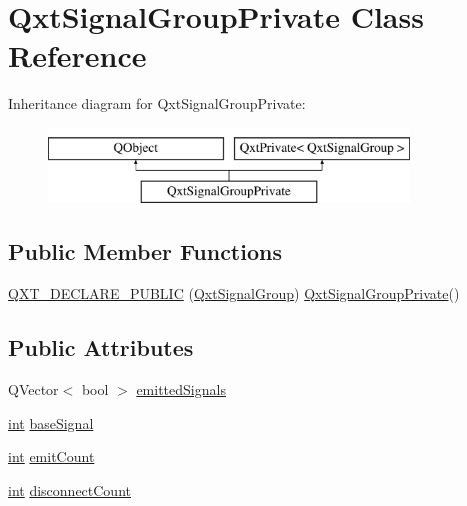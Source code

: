 \hypertarget{class_qxt_signal_group_private}{\section{Qxt\-Signal\-Group\-Private Class Reference}
\label{class_qxt_signal_group_private}
}
Inheritance diagram for Qxt\-Signal\-Group\-Private\-:\begin{figure}[H]
\begin{center}
\leavevmode
\includegraphics[height=2.000000cm]{class_qxt_signal_group_private}
\end{center}
\end{figure}
\subsection*{Public Member Functions}
\begin{DoxyCompactItemize}
\item 
\hyperlink{class_qxt_signal_group_private_a8da534a00ffee205ca4d537f215972d1}{Q\-X\-T\-\_\-\-D\-E\-C\-L\-A\-R\-E\-\_\-\-P\-U\-B\-L\-I\-C} (\hyperlink{class_qxt_signal_group}{Qxt\-Signal\-Group}) \hyperlink{class_qxt_signal_group_private}{Qxt\-Signal\-Group\-Private}()
\end{DoxyCompactItemize}
\subsection*{Public Attributes}
\begin{DoxyCompactItemize}
\item 
Q\-Vector$<$ bool $>$ \hyperlink{class_qxt_signal_group_private_a8934d259abc16403d6b2468d92be4cf4}{emitted\-Signals}
\item 
\hyperlink{ioapi_8h_a787fa3cf048117ba7123753c1e74fcd6}{int} \hyperlink{class_qxt_signal_group_private_adb2d38468b30ec5c48a9c6bd6e37fafe}{base\-Signal}
\item 
\hyperlink{ioapi_8h_a787fa3cf048117ba7123753c1e74fcd6}{int} \hyperlink{class_qxt_signal_group_private_a0291d0223e965478ec2642d0c1194b34}{emit\-Count}
\item 
\hyperlink{ioapi_8h_a787fa3cf048117ba7123753c1e74fcd6}{int} \hyperlink{class_qxt_signal_group_private_abf886764fb6ac00531ebff80f501cf43}{disconnect\-Count}
\end{DoxyCompactItemize}
